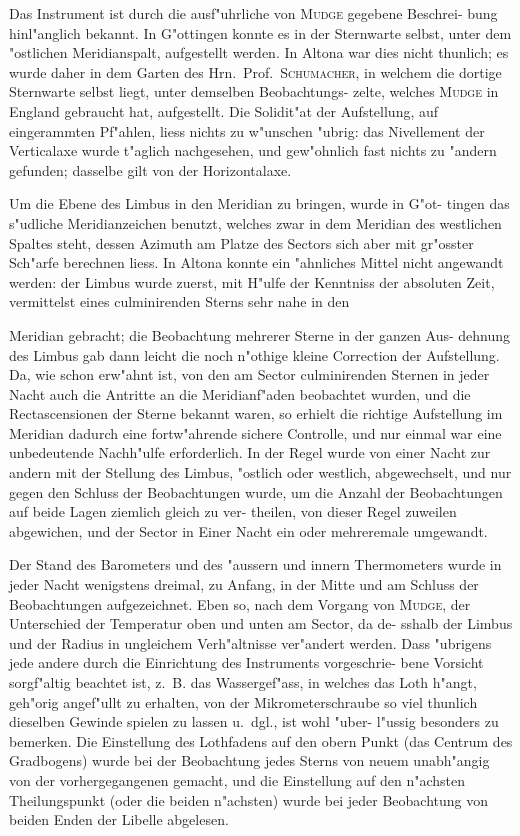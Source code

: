 \documentclass[12pt,a4paper]{article}
\theoremstyle{plain}
\theoremstyle{definition}
\theoremstyle{remark}
\begin{document}
Das Instrument ist durch die ausf"uhrliche von \textsc{Mudge} gegebene Beschrei-
bung hinl"anglich bekannt. In G"ottingen konnte es in der Sternwarte selbst,
unter dem "ostlichen Meridianspalt, aufgestellt werden. In Altona war dies
nicht thunlich; es wurde daher in dem Garten des Hrn.~Prof.~\textsc{Schumacher},
in welchem die dortige Sternwarte selbst liegt, unter demselben Beobachtungs-
zelte, welches \textsc{Mudge} in England gebraucht hat, aufgestellt. Die Solidit"at
der Aufstellung, auf eingerammten Pf"ahlen, liess nichts zu w"unschen "ubrig:
das Nivellement der Verticalaxe wurde t"aglich nachgesehen, und gew"ohnlich
fast nichts zu "andern gefunden; dasselbe gilt von der Horizontalaxe.

Um die Ebene des Limbus in den Meridian zu bringen, wurde in G"ot-
tingen das s"udliche Meridianzeichen benutzt, welches zwar in dem Meridian
des westlichen Spaltes steht, dessen Azimuth am Platze des Sectors sich aber
mit gr"osster Sch"arfe berechnen liess. In Altona konnte ein "ahnliches Mittel
nicht angewandt werden: der Limbus wurde zuerst, mit H"ulfe der Kenntniss
der absoluten Zeit, vermittelst eines culminirenden Sterns sehr nahe in den

Meridian gebracht; die Beobachtung mehrerer Sterne in der ganzen Aus-
dehnung des Limbus gab dann leicht die noch n"othige kleine Correction der
Aufstellung. Da, wie schon erw"ahnt ist, von den am Sector culminirenden
Sternen in jeder Nacht auch die Antritte an die Meridianf"aden beobachtet
wurden, und die Rectascensionen der Sterne bekannt waren, so erhielt die
richtige Aufstellung im Meridian dadurch eine fortw"ahrende sichere Controlle,
und nur einmal war eine unbedeutende Nachh"ulfe erforderlich. In der Regel
wurde von einer Nacht zur andern mit der Stellung des Limbus, "ostlich oder
westlich, abgewechselt, und nur gegen den Schluss der Beobachtungen wurde,
um die Anzahl der Beobachtungen auf beide Lagen ziemlich gleich zu ver-
theilen, von dieser Regel zuweilen abgewichen, und der Sector in Einer Nacht
ein oder mehreremale umgewandt.

Der Stand des Barometers und des "aussern und innern Thermometers
wurde in jeder Nacht wenigstens dreimal, zu Anfang, in der Mitte und am
Schluss der Beobachtungen aufgezeichnet. Eben so, nach dem Vorgang von
\textsc{Mudge}, der Unterschied der Temperatur oben und unten am Sector, da de-
sshalb der Limbus und der Radius in ungleichem Verh"altnisse ver"andert werden.
Dass "ubrigens jede andere durch die Einrichtung des Instruments vorgeschrie-
bene Vorsicht sorgf"altig beachtet ist, z.~B. das Wassergef"ass, in welches das
Loth h"angt, geh"orig angef"ullt zu erhalten, von der Mikrometerschraube so
viel thunlich dieselben Gewinde spielen zu lassen u.~dgl., ist wohl "uber-
l"ussig besonders zu bemerken. Die Einstellung des Lothfadens auf den
obern Punkt (das Centrum des Gradbogens) wurde bei der Beobachtung jedes
Sterns von neuem unabh"angig von der vorhergegangenen gemacht, und die
Einstellung auf den n"achsten Theilungspunkt (oder die beiden n"achsten) wurde
bei jeder Beobachtung von beiden Enden der Libelle abgelesen.
\end{document}
